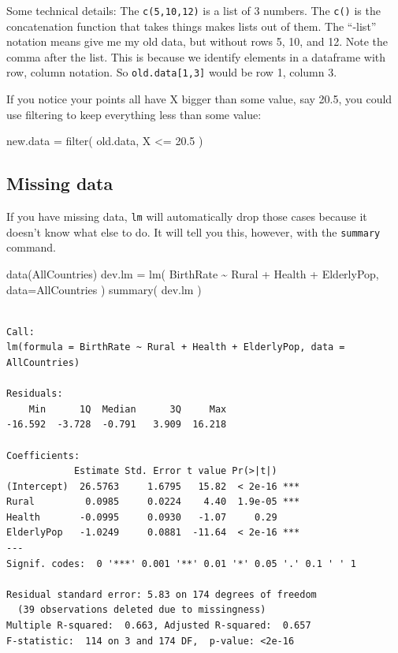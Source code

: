 \documentclass[
  letterpaper,
  DIV=11,
  numbers=noendperiod]{scrreprt}
\newenvironment{Shaded}{}{}
\newcommand{\AttributeTok}[1]{\textcolor[rgb]{0.49,0.56,0.16}{#1}}
\newcommand{\FloatTok}[1]{\textcolor[rgb]{0.25,0.63,0.44}{#1}}
\newcommand{\FunctionTok}[1]{\textcolor[rgb]{0.02,0.16,0.49}{#1}}
\newcommand{\NormalTok}[1]{#1}
\newcommand{\OtherTok}[1]{\textcolor[rgb]{0.00,0.44,0.13}{#1}}
\newcommand{\SpecialCharTok}[1]{\textcolor[rgb]{0.25,0.44,0.63}{#1}}
\begin{document}
Some technical details: The \texttt{c(5,10,12)} is a list of 3 numbers.
The \texttt{c()} is the concatenation function that takes things makes
lists out of them. The ``-list'' notation means give me my old data, but
without rows 5, 10, and 12. Note the comma after the list. This is
because we identify elements in a dataframe with row, column notation.
So \texttt{old.data{[}1,3{]}} would be row 1, column 3.

If you notice your points all have X bigger than some value, say 20.5,
you could use filtering to keep everything less than some value:

\begin{Shaded}
\begin{Highlighting}[]
\NormalTok{new.data }\OtherTok{=} \FunctionTok{filter}\NormalTok{( old.data, X }\SpecialCharTok{\textless{}=} \FloatTok{20.5}\NormalTok{ )}
\end{Highlighting}
\end{Shaded}

\subsection{Missing data}\label{missing-data}

If you have missing data, \texttt{lm} will automatically drop those
cases because it doesn't know what else to do. It will tell you this,
however, with the \texttt{summary} command.

\begin{Shaded}
\begin{Highlighting}[]
\FunctionTok{data}\NormalTok{(AllCountries)}
\NormalTok{dev.lm }\OtherTok{=} \FunctionTok{lm}\NormalTok{( BirthRate }\SpecialCharTok{\textasciitilde{}}\NormalTok{ Rural }\SpecialCharTok{+}\NormalTok{ Health }\SpecialCharTok{+}\NormalTok{ ElderlyPop, }\AttributeTok{data=}\NormalTok{AllCountries )}
\FunctionTok{summary}\NormalTok{( dev.lm  )}
\end{Highlighting}
\end{Shaded}

\begin{verbatim}

Call:
lm(formula = BirthRate ~ Rural + Health + ElderlyPop, data = AllCountries)

Residuals:
    Min      1Q  Median      3Q     Max 
-16.592  -3.728  -0.791   3.909  16.218 

Coefficients:
            Estimate Std. Error t value Pr(>|t|)    
(Intercept)  26.5763     1.6795   15.82  < 2e-16 ***
Rural         0.0985     0.0224    4.40  1.9e-05 ***
Health       -0.0995     0.0930   -1.07     0.29    
ElderlyPop   -1.0249     0.0881  -11.64  < 2e-16 ***
---
Signif. codes:  0 '***' 0.001 '**' 0.01 '*' 0.05 '.' 0.1 ' ' 1

Residual standard error: 5.83 on 174 degrees of freedom
  (39 observations deleted due to missingness)
Multiple R-squared:  0.663, Adjusted R-squared:  0.657 
F-statistic:  114 on 3 and 174 DF,  p-value: <2e-16
\end{verbatim}
\end{document}

